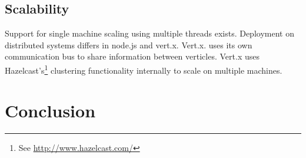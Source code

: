 

\subsection{Scalability}
\label{scalability}
Support for single machine scaling using multiple threads exists.
Deployment on distributed systems differs in node.js and vert.x.
Vert.x. uses its own communication bus to share information between verticles.
Vert.x uses Hazelcast's\footnote{See \url{http://www.hazelcast.com/}} clustering functionality internally to scale on multiple machines. 


\section{Conclusion}
\label{conclusion}


